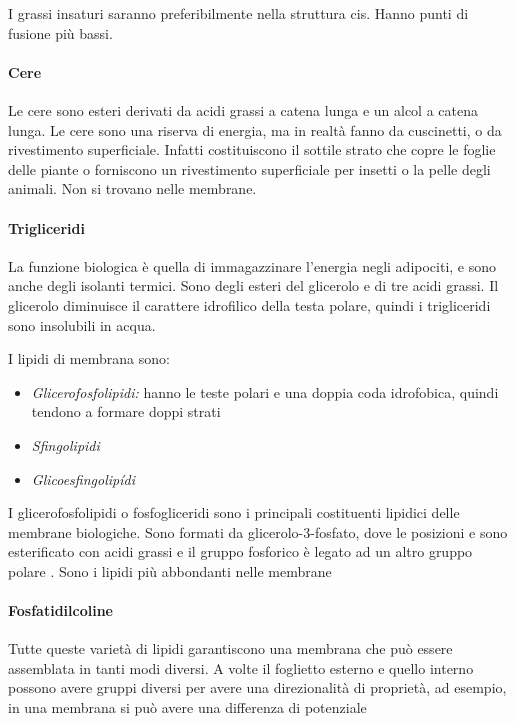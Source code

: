 I grassi insaturi saranno preferibilmente nella struttura cis. Hanno punti di fusione più bassi.

\paragraph{Cere}
Le cere sono esteri derivati da acidi grassi a catena lunga e un alcol a catena lunga. Le cere sono una riserva di energia, ma in realtà fanno da cuscinetti, o da rivestimento superficiale. Infatti costituiscono il sottile strato che copre le foglie delle piante o forniscono un rivestimento superficiale per insetti o la pelle degli animali. Non si trovano nelle membrane.

\paragraph{Trigliceridi}
La funzione biologica è quella di immagazzinare l'energia negli adipociti, e sono anche degli isolanti termici. Sono degli esteri del glicerolo e di tre acidi grassi.
Il glicerolo diminuisce il carattere idrofilico della testa polare, quindi i trigliceridi sono insolubili in acqua.


\clearpage

I lipidi di membrana sono:
\begin{itemize}
\item \emph{Glicerofosfolipidi:} hanno le teste polari e una doppia coda idrofobica, quindi tendono a formare doppi strati
\item \emph{Sfingolipidi}
\item \emph{Glicoesfingolipídi}
\end{itemize}

I glicerofosfolipidi o fosfogliceridi sono i principali costituenti lipidici delle membrane biologiche. Sono formati da glicerolo-3-fosfato, dove le posizioni  e  sono esterificato con acidi grassi e il gruppo fosforico è legato ad un altro gruppo polare . Sono i lipidi più abbondanti nelle membrane


\paragraph{Fosfatidilcoline}


Tutte queste varietà di lipidi garantiscono una membrana che può essere assemblata in tanti modi diversi. A volte il foglietto esterno e quello interno possono avere gruppi diversi per avere una direzionalità di proprietà, ad esempio, in una membrana si può avere una differenza di potenziale


